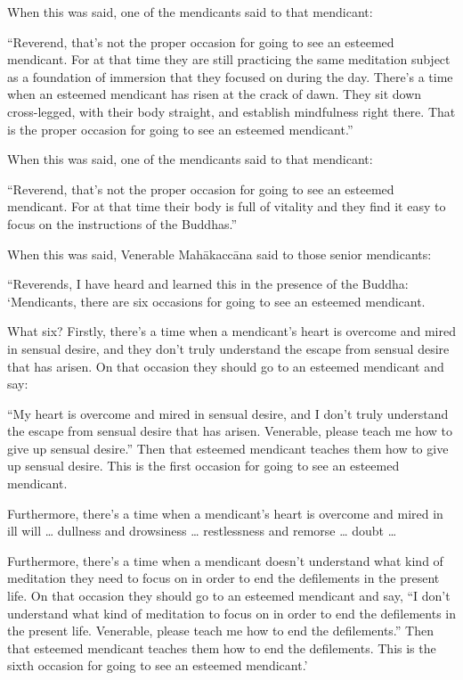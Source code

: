 \documentclass[12pt,openany]{book}%
\begin{document}
When this was said, one of the mendicants said to that mendicant: 

“Reverend, that’s not the proper occasion for going to see an esteemed mendicant. For at that time they are still practicing the same meditation subject as a foundation of immersion that they focused on during the day. There’s a time when an esteemed mendicant has risen at the crack of dawn. They sit down cross-legged, with their body straight, and establish mindfulness right there. That is the proper occasion for going to see an esteemed mendicant.” 

When this was said, one of the mendicants said to that mendicant: 

“Reverend, that’s not the proper occasion for going to see an esteemed mendicant. For at that time their body is full of vitality and they find it easy to focus on the instructions of the Buddhas.” 

When this was said, Venerable \textsanskrit{Mahākaccāna} said to those senior mendicants: 

“Reverends, I have heard and learned this in the presence of the Buddha: ‘Mendicants, there are six occasions for going to see an esteemed mendicant. 

What six? Firstly, there’s a time when a mendicant’s heart is overcome and mired in sensual desire, and they don’t truly understand the escape from sensual desire that has arisen. On that occasion they should go to an esteemed mendicant and say: 

“My heart is overcome and mired in sensual desire, and I don’t truly understand the escape from sensual desire that has arisen. Venerable, please teach me how to give up sensual desire.” Then that esteemed mendicant teaches them how to give up sensual desire. This is the first occasion for going to see an esteemed mendicant. 

Furthermore, there’s a time when a mendicant’s heart is overcome and mired in ill will … dullness and drowsiness … restlessness and remorse … doubt … 

Furthermore, there’s a time when a mendicant doesn’t understand what kind of meditation they need to focus on in order to end the defilements in the present life. On that occasion they should go to an esteemed mendicant and say, “I don’t understand what kind of meditation to focus on in order to end the defilements in the present life. Venerable, please teach me how to end the defilements.” Then that esteemed mendicant teaches them how to end the defilements. This is the sixth occasion for going to see an esteemed mendicant.’ 
\end{document}
